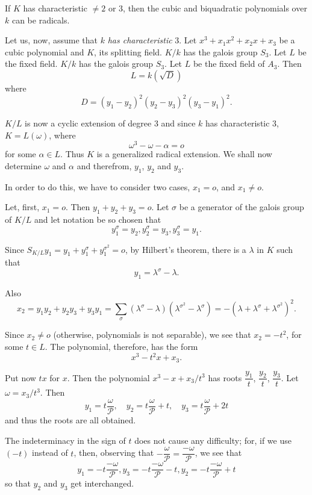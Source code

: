 \begin{thm}\label{c6:thm18} %
If $K$ has characteristic $\neq 2$ or 3, then  the cubic and
  biquadratic polynomials over $k$ can be radicals. 
 \end{thm} 
 
 Let us, now, assume that $k$ \textit{has characteristic} 3. Let $x^3
 +  x_1 x^2 +x_2 x+x_3$ be a cubic polynomial and $K$, its splitting
 field. $K/k$ has the galois group $S_3$. Let $L$ be the fixed
 field. $K/k$ has the galois  group $S_3$. Let  $L$ be the  fixed
 field  of $A_3$. Then  
 $$
 L=k (\sqrt{D})
 $$
 where 
 $$
 D= (y_1- y_2)^2 (y_2- y_3)^2 (y_3- y_1)^2.
 $$
 
 $K/L$ is now a cyclic extension of degree 3 and since $k$ has
 characteristic 3, $K=L(\omega)$, where 
 $$
 \omega^3- \omega- \alpha=o
 $$
 for some  $\alpha \in L$. Thus $K$ is a generalized  radical
 extension. We shall now determine $\omega$ and $\alpha$ and
 therefrom, $y_1$, $y_2$ and $y_3$. 
 
 In order to do this, we have  to consider  two cases,  $x_1=o$, and
 $x_1 \neq o$. 
 
 Let, first, $x_1=o$. Then $y_1 +y_2 +y_3=o$. Let $\sigma$ be a
 generator  of the galois  group  of $K/L$ and let  notation be so
 chosen that  
 $$
 y^\sigma_1 =y_2, y^\sigma_2 =  y_3 , y^\sigma_3 = y_1.
 $$
 
 Since $S_{K/L} y_1= y_1+y_1^\sigma +y_1^{\sigma^2}=o$, by Hilbert's
 theorem, there is a $\lambda$ in $K$ such that  
 $$
 y_1 = \lambda^\sigma -\lambda.
 $$ 
  
 Also\pageoriginale
 $$
 x_2 = y_1 y_2+y_2y_3+y_3y_1 =\sum_{\sigma}(\lambda^\sigma-
 \lambda)(\lambda^{\sigma^2}- \lambda^\sigma) =-
 (\lambda+\lambda^\sigma + \lambda^{\sigma^{2}})^2. 
 $$
 
 Since $x_2 \neq o$ (otherwise, polynomials is not separable), we see
 that $x_2=- t^2$, for some $t \in L$. The  polynomial, therefore, has
 the form  
 $$
 x^3- t^2 x+x_3. 
 $$
 
 Put now $tx$ for $x$. Then  the polynomial $x^3-x+x_3/t^3$ has roots
 $\dfrac{y_1}{t}$, $\dfrac{y_2}{t}$, $\dfrac{y_3}{t}$. Let $\omega= x_3/
 t^3$. Then  
 $$
  y_1 = t \frac{\omega}{\mathscr{P}}, \quad y_2 = t
  \frac{\omega}{\mathscr{P}}+t, \quad  y_3 = t \frac{\omega}{\mathscr{P}}+ 2t 
  $$
 and thus the roots are all obtained.
 
 The indeterminacy in the sign  of $t$ does not cause  any
 difficulty; for, if we use $(-t)$ instead of $t$, then, observing that
 $- \dfrac{\omega}{\mathscr{P}}= \dfrac{-\omega}{\mathscr{P}}$, we see
 that  
 $$
 y_1 = - t \frac{-\omega}{\mathscr{P}}, y_3 = - t \frac{-
   \omega}{\mathscr{P}} -t, y_2 =-t \frac{- \omega}{\mathscr{P}}+t 
 $$
 so that $y_2$ and $y_3$ get  interchanged.
 

